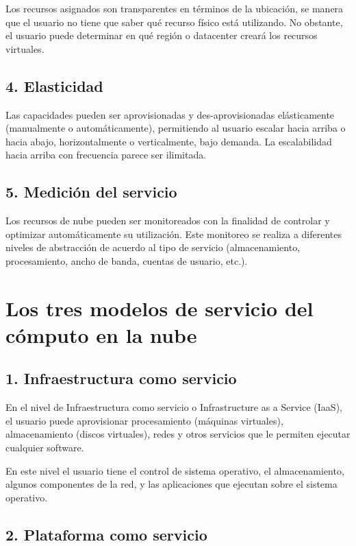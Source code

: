 Los recursos asignados son transparentes en términos de la ubicación, se manera que el usuario no tiene que saber qué recurso físico está utilizando. No obstante, el usuario puede determinar en qué región o datacenter creará los recursos virtuales.

\subsection{4. Elasticidad}

Las capacidades pueden ser aprovisionadas y des-aprovisionadas elásticamente (manualmente o automáticamente), permitiendo al usuario escalar hacia arriba o hacia abajo, horizontalmente o verticalmente, bajo demanda. La escalabilidad hacia arriba con frecuencia parece ser ilimitada.

\subsection{5. Medición del servicio}

Los recursos de nube pueden ser monitoreados con la finalidad de controlar y optimizar automáticamente su utilización. Este monitoreo se realiza a diferentes niveles de abstracción de acuerdo al tipo de servicio (almacenamiento, procesamiento, ancho de banda, cuentas de usuario, etc.).

\section{Los tres modelos de servicio del cómputo en la nube}

\subsection{1. Infraestructura como servicio}

En el nivel de Infraestructura como servicio o Infrastructure as a Service (IaaS), el usuario puede aprovisionar procesamiento (máquinas virtuales), almacenamiento (discos virtuales), redes y otros servicios que le permiten ejecutar cualquier software.

En este nivel el usuario tiene el control de sistema operativo, el almacenamiento, algunos componentes de la red, y las aplicaciones que ejecutan sobre el sistema operativo.

\subsection{2. Plataforma como servicio}

